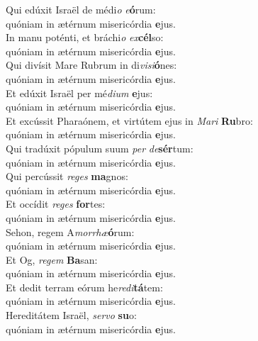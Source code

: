 \evenverse Qui edúxit Israël de médi\textit{o} \textit{e}\textbf{ó}rum:~\*\\
\evenverse quóniam in ætérnum misericórdia \textbf{e}jus.\\
\oddverse In manu poténti, et bráchi\textit{o} \textit{ex}\textbf{cél}so:~\*\\
\oddverse quóniam in ætérnum misericórdia \textbf{e}jus.\\
\evenverse Qui divísit Mare Rubrum in di\textit{vi}\textit{si}\textbf{ó}nes:~\*\\
\evenverse quóniam in ætérnum misericórdia \textbf{e}jus.\\
\oddverse Et edúxit Israël per mé\textit{di}\textit{um} \textbf{e}jus:~\*\\
\oddverse quóniam in ætérnum misericórdia \textbf{e}jus.\\
\evenverse Et excússit Pharaónem, et virtútem ejus in \textit{Ma}\textit{ri} \textbf{Ru}bro:~\*\\
\evenverse quóniam in ætérnum misericórdia \textbf{e}jus.\\
\oddverse Qui tradúxit pópulum suum \textit{per} \textit{de}\textbf{sér}tum:~\*\\
\oddverse quóniam in ætérnum misericórdia \textbf{e}jus.\\
\evenverse Qui percússit \textit{re}\textit{ges} \textbf{ma}gnos:~\*\\
\evenverse quóniam in ætérnum misericórdia \textbf{e}jus.\\
\oddverse Et occídit \textit{re}\textit{ges} \textbf{for}tes:~\*\\
\oddverse quóniam in ætérnum misericórdia \textbf{e}jus.\\
\evenverse Sehon, regem A\textit{mor}\textit{rhæ}\textbf{ó}rum:~\*\\
\evenverse quóniam in ætérnum misericórdia \textbf{e}jus.\\
\oddverse Et Og, \textit{re}\textit{gem} \textbf{Ba}san:~\*\\
\oddverse quóniam in ætérnum misericórdia \textbf{e}jus.\\
\evenverse Et dedit terram eórum he\textit{re}\textit{di}\textbf{tá}tem:~\*\\
\evenverse quóniam in ætérnum misericórdia \textbf{e}jus.\\
\oddverse Hereditátem Israël, \textit{ser}\textit{vo} \textbf{su}o:~\*\\
\oddverse quóniam in ætérnum misericórdia \textbf{e}jus.\\
